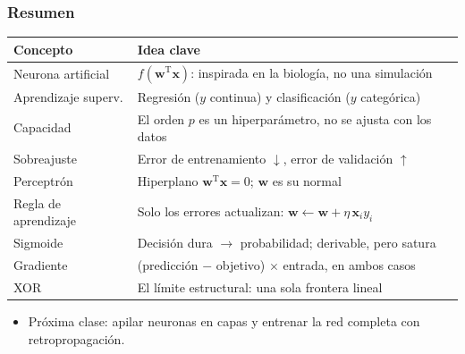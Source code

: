\documentclass[aspectratio=169, 10pt]{beamer}
\begin{document}
\begin{frame}
\frametitle{Resumen}
\begin{center}
\begin{tabular}{ll}
\toprule
\textbf{Concepto} & \textbf{Idea clave}\\
\midrule
Neurona artificial   & $f(\mathbf w^{\mathrm{T}}\mathbf x)$: inspirada en la biolog\'ia, no una simulaci\'on\\
Aprendizaje superv.  & Regresi\'on ($y$ continua) y clasificaci\'on ($y$ categ\'orica)\\
Capacidad            & El orden $p$ es un hiperpar\'ametro, no se ajusta con los datos\\
Sobreajuste          & Error de entrenamiento $\downarrow$, error de validaci\'on $\uparrow$\\
Perceptr\'on         & Hiperplano $\mathbf w^{\mathrm{T}}\mathbf x = 0$; $\mathbf w$ es su normal\\
Regla de aprendizaje & Solo los errores actualizan: $\mathbf w \leftarrow \mathbf w + \eta\,\mathbf x_i y_i$\\
Sigmoide             & Decisi\'on dura $\rightarrow$ probabilidad; derivable, pero satura\\
Gradiente            & (predicci\'on $-$ objetivo) $\times$ entrada, en ambos casos\\
XOR                  & El l\'imite estructural: una sola frontera lineal\\
\bottomrule
\end{tabular}
\end{center}
\vspace{0.7em}
\begin{itemize}
	\item Pr\'oxima clase: apilar neuronas en capas y entrenar la red completa con retropropagaci\'on.
\end{itemize}
\end{frame}
\end{document}

